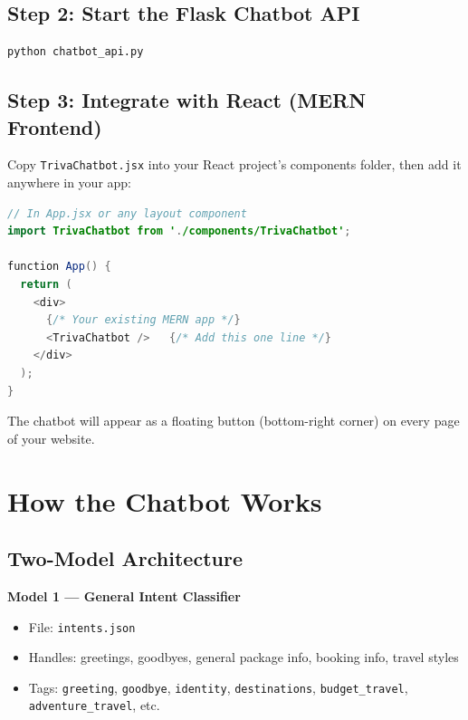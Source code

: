 \documentclass[12pt,a4paper]{article}
\newcommand{\file}[1]{\texttt{\textcolor{travayagreen}{#1}}}
\newcommand{\tag}[1]{\texttt{#1}}
\begin{document}
\subsection{Step 2: Start the Flask Chatbot API}

\begin{lstlisting}[language=bash]
python chatbot_api.py
\end{lstlisting}

\subsection{Step 3: Integrate with React (MERN Frontend)}

Copy \file{TrivaChatbot.jsx} into your React project's components folder, then add it anywhere in your app:

\begin{lstlisting}[language=Java, caption={App.jsx --- Adding Triva to MERN frontend}]
// In App.jsx or any layout component
import TrivaChatbot from './components/TrivaChatbot';

function App() {
  return (
    <div>
      {/* Your existing MERN app */}
      <TrivaChatbot />   {/* Add this one line */}
    </div>
  );
}
\end{lstlisting}

The chatbot will appear as a floating button (bottom-right corner) on every page of your website.

\section{How the Chatbot Works}

\subsection{Two-Model Architecture}

\textbf{Model 1 --- General Intent Classifier}
\begin{itemize}[noitemsep]
  \item File: \file{intents.json}
  \item Handles: greetings, goodbyes, general package info, booking info, travel styles
  \item Tags: \tag{greeting}, \tag{goodbye}, \tag{identity}, \tag{destinations}, \tag{budget\_travel}, \tag{adventure\_travel}, etc.
\end{itemize}
\end{document}
